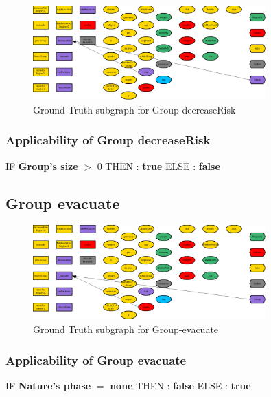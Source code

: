 \documentclass{article}%
\begin{document}
\begin{figure}[ht]%
\centering%
\includegraphics[width=0.8\textwidth]{images/Group-decreaseRisk.png}%
\caption{Ground Truth subgraph for Group{-}decreaseRisk}%
\end{figure}

%
\subsubsection{Applicability of Group decreaseRisk}%
\label{ssubsec:Applicability of Group decreaseRisk}%
\begin{flushleft}%
IF %
\textbf{Group's size}%
$>$%
0%
\linebreak%
\hspace*{2em}%
THEN %
: %
\textbf{true}%
\linebreak%
\hspace*{2em}%
ELSE %
: %
\textbf{false}%
\end{flushleft}

%
\subsection{Group evacuate}%
\label{subsec:Group evacuate}%


\begin{figure}[ht]%
\centering%
\includegraphics[width=0.8\textwidth]{images/Group-evacuate.png}%
\caption{Ground Truth subgraph for Group{-}evacuate}%
\end{figure}

%
\subsubsection{Applicability of Group evacuate}%
\label{ssubsec:Applicability of Group evacuate}%
\begin{flushleft}%
IF %
\textbf{Nature's phase}%
$=$%
\textbf{none}%
\linebreak%
\hspace*{2em}%
THEN %
: %
\textbf{false}%
\linebreak%
\hspace*{2em}%
ELSE %
: %
\textbf{true}%
\end{flushleft}
\end{document}
